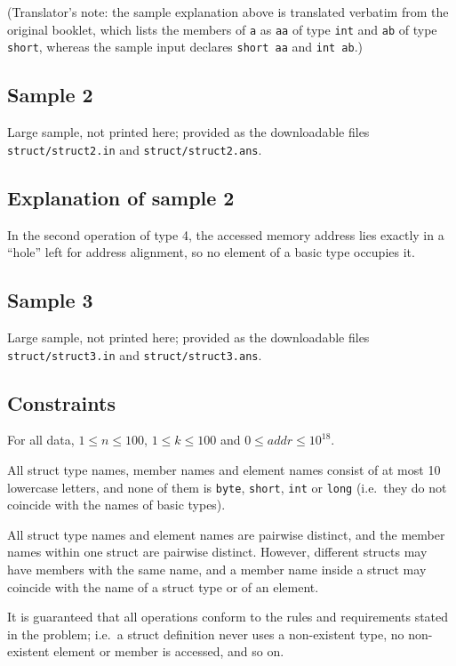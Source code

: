 \documentclass[11pt]{article}
\begin{document}
(Translator's note: the sample explanation above is translated verbatim
from the original booklet, which lists the members of \texttt{a} as
\texttt{aa} of type \texttt{int} and \texttt{ab} of type \texttt{short},
whereas the sample input declares \texttt{short aa} and \texttt{int ab}.)

\subsection*{Sample 2}

Large sample, not printed here;
provided as the downloadable files \texttt{struct/struct2.in} and \texttt{struct/struct2.ans}.

\subsection*{Explanation of sample 2}

In the second operation of type 4, the accessed memory address lies
exactly in a ``hole'' left for address alignment, so no element of a
basic type occupies it.

\subsection*{Sample 3}

Large sample, not printed here;
provided as the downloadable files \texttt{struct/struct3.in} and \texttt{struct/struct3.ans}.

\subsection*{Constraints}

For all data, $1 \le n \le 100$, $1 \le k \le 100$ and
$0 \le addr \le 10^{18}$.

All struct type names, member names and element names consist of at most
10 lowercase letters, and none of them is \texttt{byte}, \texttt{short},
\texttt{int} or \texttt{long} (i.e.\ they do not coincide with the names
of basic types).

All struct type names and element names are pairwise distinct, and the
member names within one struct are pairwise distinct.
However, different structs may have members with the same name, and a
member name inside a struct may coincide with the name of a struct type or
of an element.

It is guaranteed that all operations conform to the rules and
requirements stated in the problem; i.e.\ a struct definition never uses a
non-existent type, no non-existent element or member is accessed, and so
on.
\end{document}
